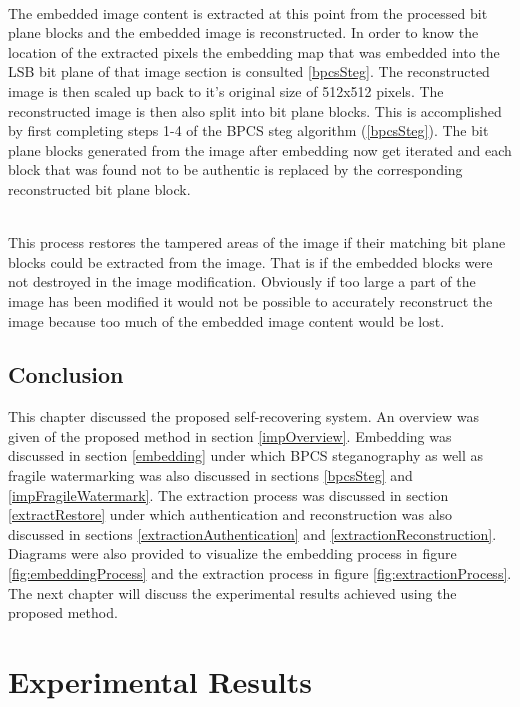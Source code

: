 \documentclass[12pt]{article}
\begin{document}
\hspace{0pt} \\
The embedded image content is extracted at this point from the processed bit plane blocks and the embedded image is reconstructed.
In order to know the location of the extracted pixels the embedding map that was embedded into the LSB bit plane of that image section is consulted \ref{bpcsSteg}.
The reconstructed image is then scaled up back to it's original size of 512x512 pixels.
The reconstructed image is then also split into bit plane blocks.
This is accomplished by first completing steps 1-4 of the BPCS steg algorithm (\ref{bpcsSteg}).
The bit plane blocks generated from the image after embedding now get iterated and each block that was found not to be authentic is replaced by the corresponding reconstructed bit plane block. 

\hspace{0pt} \\
This process restores the tampered areas of the image if their matching bit plane blocks could be extracted from the image. That is if the embedded blocks were not destroyed in the image modification. 
Obviously if too large a part of the image has been modified it would not be possible to accurately reconstruct the image because too much of the embedded image content would be lost.

\subsection{Conclusion}
This chapter discussed the proposed self-recovering system. An overview was given of the proposed method in section \ref{impOverview}. 
Embedding was discussed in section \ref{embedding} under which BPCS steganography as well as fragile watermarking was also discussed in sections \ref{bpcsSteg} and \ref{impFragileWatermark}.
The extraction process was discussed in section \ref{extractRestore} under which authentication and reconstruction was also discussed in sections \ref{extractionAuthentication} and \ref{extractionReconstruction}. 
Diagrams were also provided to visualize the embedding process in figure \ref{fig:embeddingProcess} and the extraction process in figure \ref{fig:extractionProcess}.
The next chapter will discuss the experimental results achieved using the proposed method.


\section{Experimental Results} 
\end{document}
